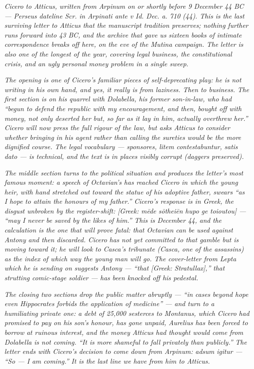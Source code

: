 
\textit{Cicero to Atticus, written from Arpinum on or shortly
before 9 December 44 BC --- Perseus dateline
\textit{Scr. in Arpinati ante v Id. Dec. a. 710 (44)}. This is
the last surviving letter to Atticus that the manuscript
tradition preserves; nothing further runs forward into 43 BC,
and the archive that gave us sixteen books of intimate
correspondence breaks off here, on the eve of the Mutina
campaign. The letter is also one of the longest of the year,
covering legal business, the constitutional crisis, and an
ugly personal money problem in a single sweep.}

\textit{The opening is one of Cicero's familiar pieces of
self-deprecating play: he is not writing in his own hand, and
yes, it really is from laziness. Then to business. The first
section is on his quarrel with Dolabella, his former
son-in-law, who had ``begun to defend the republic with my
encouragement, and then, bought off with money, not only
deserted her but, so far as it lay in him, actually overthrew
her.'' Cicero will now press the full rigour of the law, but
asks Atticus to consider whether bringing in his agent rather
than calling the sureties would be the more dignified course.
The legal vocabulary --- \textit{sponsores}, \textit{litem
contestabuntur}, \textit{satis dato} --- is technical, and the
text is in places visibly corrupt (daggers preserved).}

\textit{The middle section turns to the political situation
and produces the letter's most famous moment: a speech of
Octavian's has reached Cicero in which the young heir, with
hand stretched out toward the statue of his adoptive father,
swears ``as I hope to attain the honours of my father.''
Cicero's response is in Greek, the disgust unbroken by the
register-shift: \textit{[Greek: m\=ede s\=othei\=en hupo ge
toioutou]} --- ``may I never be saved by the likes of him.''
This is December 44, and the calculation is the one that will
prove fatal: that Octavian can be used against Antony and then
discarded. Cicero has not yet committed to that gamble but is
moving toward it; he will look to Casca's tribunate (Casca,
one of the assassins) as the index of which way the young man
will go. The cover-letter from Lepta which he is sending on
suggests Antony --- ``that \textit{[Greek: Stratullax]},''
that strutting comic-stage soldier --- has been knocked off
his pedestal.}

\textit{The closing two sections drop the public matter
abruptly --- ``in cases beyond hope even Hippocrates forbids
the application of medicine'' --- and turn to a humiliating
private one: a debt of 25{,}000 sesterces to Montanus, which
Cicero had promised to pay on his son's honour, has gone
unpaid, Aurelius has been forced to borrow at ruinous
interest, and the money Atticus had thought would come from
Dolabella is not coming. ``It is more shameful to fall
privately than publicly.'' The letter ends with Cicero's
decision to come down from Arpinum: \textit{adsum igitur} ---
``So --- I am coming.'' It is the last line we have from him
to Atticus.}
